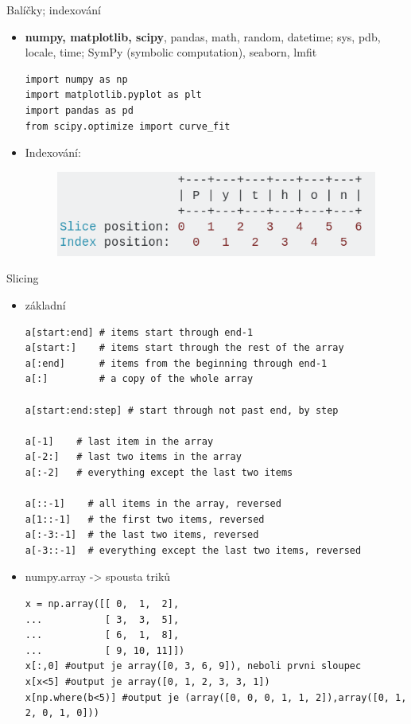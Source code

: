 \documentclass[10pt]{beamer}
\begin{document}
\begin{frame}[fragile]{Balíčky; indexování}
    \begin{itemize}
        \item \textbf{numpy, matplotlib, scipy}, pandas, math, random, datetime; sys, pdb, locale, time; SymPy (symbolic computation), seaborn, lmfit
\begin{lstlisting}[columns=fullflexible]
import numpy as np
import matplotlib.pyplot as plt
import pandas as pd
from scipy.optimize import curve_fit
\end{lstlisting}
\item Indexování:
    \begin{figure}
        \centering
        \includegraphics[width=.5\textwidth]{slicing.png}
    \end{figure}
    \end{itemize}
\end{frame}

\begin{frame}[fragile]{Slicing}
    \begin{itemize}
        \item základní
            \begin{lstlisting}[columns=flexible]
a[start:end] # items start through end-1
a[start:]    # items start through the rest of the array
a[:end]      # items from the beginning through end-1
a[:]         # a copy of the whole array

a[start:end:step] # start through not past end, by step

a[-1]    # last item in the array
a[-2:]   # last two items in the array
a[:-2]   # everything except the last two items

a[::-1]    # all items in the array, reversed
a[1::-1]   # the first two items, reversed
a[:-3:-1]  # the last two items, reversed
a[-3::-1]  # everything except the last two items, reversed
\end{lstlisting}
        \item numpy.array -> spousta triků
            \begin{lstlisting}[columns=flexible]
x = np.array([[ 0,  1,  2],
...           [ 3,  3,  5],
...           [ 6,  1,  8],
...           [ 9, 10, 11]])
x[:,0] #output je array([0, 3, 6, 9]), neboli prvni sloupec
x[x<5] #output je array([0, 1, 2, 3, 3, 1])
x[np.where(b<5)] #output je (array([0, 0, 0, 1, 1, 2]),array([0, 1, 2, 0, 1, 0]))
\end{lstlisting}
    \end{itemize}
\end{frame}
\end{document}
